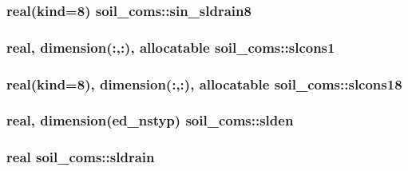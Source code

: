 \subsubsection[{\texorpdfstring{sin\+\_\+sldrain8}{sin_sldrain8}}]{\setlength{\rightskip}{0pt plus 5cm}real(kind=8) soil\+\_\+coms\+::sin\+\_\+sldrain8}\hypertarget{namespacesoil__coms_a29640d5396281a106cd29a5433cc4896}{}\label{namespacesoil__coms_a29640d5396281a106cd29a5433cc4896}
\subsubsection[{\texorpdfstring{slcons1}{slcons1}}]{\setlength{\rightskip}{0pt plus 5cm}real, dimension(\+:,\+:), allocatable soil\+\_\+coms\+::slcons1}\hypertarget{namespacesoil__coms_a0550c5c548dbfde659a2d622a91b26f5}{}\label{namespacesoil__coms_a0550c5c548dbfde659a2d622a91b26f5}
\subsubsection[{\texorpdfstring{slcons18}{slcons18}}]{\setlength{\rightskip}{0pt plus 5cm}real(kind=8), dimension(\+:,\+:), allocatable soil\+\_\+coms\+::slcons18}\hypertarget{namespacesoil__coms_ade6e1d0e2d355c5f3a340352163128d9}{}\label{namespacesoil__coms_ade6e1d0e2d355c5f3a340352163128d9}
\subsubsection[{\texorpdfstring{slden}{slden}}]{\setlength{\rightskip}{0pt plus 5cm}real, dimension({\bf ed\+\_\+nstyp}) soil\+\_\+coms\+::slden}\hypertarget{namespacesoil__coms_ab18d5a835f6246621b56d3023dd721da}{}\label{namespacesoil__coms_ab18d5a835f6246621b56d3023dd721da}
\subsubsection[{\texorpdfstring{sldrain}{sldrain}}]{\setlength{\rightskip}{0pt plus 5cm}real soil\+\_\+coms\+::sldrain}\hypertarget{namespacesoil__coms_af1b6a6b86baeaad4354a141fdf9cfb04}{}\label{namespacesoil__coms_af1b6a6b86baeaad4354a141fdf9cfb04}
